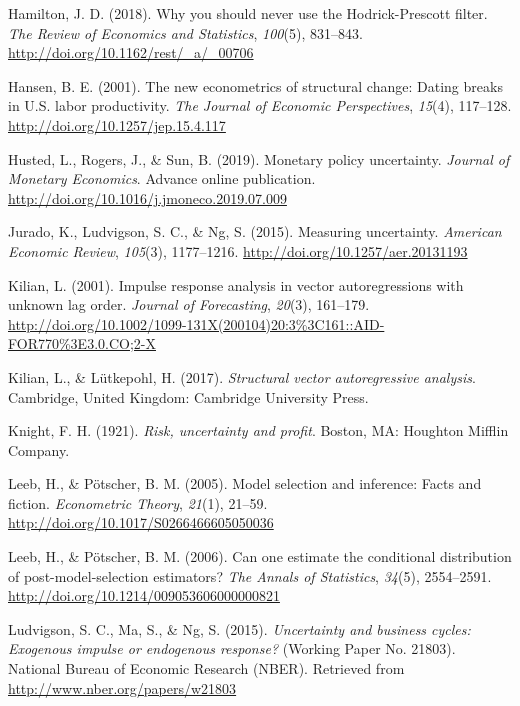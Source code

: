 \documentclass[12pt,twoside]{reedthesis}
\begin{document}
\leavevmode\hypertarget{ref-hamilton:2018}{}%
Hamilton, J. D. (2018). Why you should never use the Hodrick-Prescott filter. \emph{The Review of Economics and Statistics}, \emph{100}(5), 831--843. \url{http://doi.org/10.1162/rest/_a/_00706}

\leavevmode\hypertarget{ref-hansen:2001}{}%
Hansen, B. E. (2001). The new econometrics of structural change: Dating breaks in U.S. labor productivity. \emph{The Journal of Economic Perspectives}, \emph{15}(4), 117--128. \url{http://doi.org/10.1257/jep.15.4.117}

\leavevmode\hypertarget{ref-hustetal:2019}{}%
Husted, L., Rogers, J., \& Sun, B. (2019). Monetary policy uncertainty. \emph{Journal of Monetary Economics}. Advance online publication. \url{http://doi.org/10.1016/j.jmoneco.2019.07.009}

\leavevmode\hypertarget{ref-juraetal:2015}{}%
Jurado, K., Ludvigson, S. C., \& Ng, S. (2015). Measuring uncertainty. \emph{American Economic Review}, \emph{105}(3), 1177--1216. \url{http://doi.org/10.1257/aer.20131193}

\leavevmode\hypertarget{ref-kilian:2001}{}%
Kilian, L. (2001). Impulse response analysis in vector autoregressions with unknown lag order. \emph{Journal of Forecasting}, \emph{20}(3), 161--179. \url{http://doi.org/10.1002/1099-131X(200104)20:3\%3C161::AID-FOR770\%3E3.0.CO;2-X}

\leavevmode\hypertarget{ref-kililutk:2017}{}%
Kilian, L., \& Lütkepohl, H. (2017). \emph{Structural vector autoregressive analysis}. Cambridge, United Kingdom: Cambridge University Press.

\leavevmode\hypertarget{ref-knight:1921}{}%
Knight, F. H. (1921). \emph{Risk, uncertainty and profit}. Boston, MA: Houghton Mifflin Company.

\leavevmode\hypertarget{ref-leebpots:2005}{}%
Leeb, H., \& Pötscher, B. M. (2005). Model selection and inference: Facts and fiction. \emph{Econometric Theory}, \emph{21}(1), 21--59. \url{http://doi.org/10.1017/S0266466605050036}

\leavevmode\hypertarget{ref-leebpots:2006}{}%
Leeb, H., \& Pötscher, B. M. (2006). Can one estimate the conditional distribution of post-model-selection estimators? \emph{The Annals of Statistics}, \emph{34}(5), 2554--2591. \url{http://doi.org/10.1214/009053606000000821}

\leavevmode\hypertarget{ref-ludvetal:2015}{}%
Ludvigson, S. C., Ma, S., \& Ng, S. (2015). \emph{Uncertainty and business cycles: Exogenous impulse or endogenous response?} (Working Paper No. 21803). National Bureau of Economic Research (NBER). Retrieved from \url{http://www.nber.org/papers/w21803}
\end{document}
